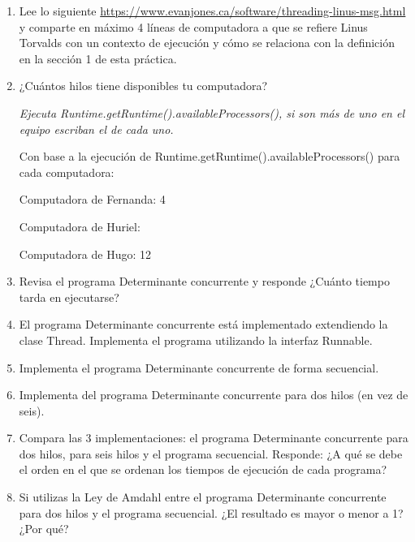 \begin{enumerate}
    \item Lee lo siguiente \href{https://www.evanjones.ca/software/threading-linus-msg.html}{https://www.evanjones.ca/software/threading-linus-msg.html} y comparte en máximo 4 líneas de computadora a que se refiere Linus Torvalds con un contexto de ejecución y cómo se relaciona con la definición en la sección 1 de esta práctica.

    \hfill
    
    \item  ¿Cuántos hilos tiene disponibles tu computadora?
    
    \textit{Ejecuta Runtime.getRuntime().availableProcessors(), si son más de uno en el equipo escriban el de cada uno.}

    Con base a la ejecución de Runtime.getRuntime().availableProcessors() para cada computadora:

    Computadora de Fernanda: 4

    Computadora de Huriel:

    Computadora de Hugo: 12

    \hfill
    
    \item Revisa el programa Determinante concurrente y responde ¿Cuánto tiempo tarda en ejecutarse?

    \hfill    

    \item El programa Determinante concurrente está implementado extendiendo la clase Thread. Implementa el programa utilizando la interfaz Runnable.

    \hfill
    
    \item Implementa el programa Determinante concurrente de forma secuencial.

    \hfill
    
    \item Implementa del programa Determinante concurrente para dos hilos (en vez de seis).

    \hfill

    \item Compara las 3 implementaciones: el programa Determinante concurrente para dos hilos, para seis hilos y el programa secuencial. Responde: ¿A qué se debe el orden en el que se ordenan los tiempos de ejecución de cada programa?

    \hfill    
    
    \item Si utilizas la Ley de Amdahl entre el programa Determinante concurrente para dos hilos y el programa secuencial. ¿El resultado es mayor o menor a 1? ¿Por qué?


\end{enumerate}
